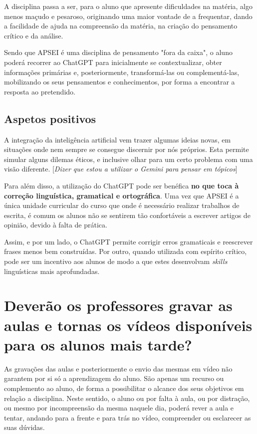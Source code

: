 \documentclass[portuguese, 11pt, a4paper, titlepage, oneside]{article}
\begin{document}
A disciplina passa a ser, para o aluno que apresente dificuldades na matéria, algo menos maçudo e pesaroso, originando uma maior vontade de a frequentar, dando a facilidade de ajuda na compreensão da matéria, na criação do pensamento crítico e da análise.

Sendo que APSEI é uma disciplina de pensamento "fora da caixa", o aluno poderá recorrer ao ChatGPT para inicialmente se contextualizar, obter informações primárias e, posteriormente, transformá-las ou complementá-las, mobilizando os seus pensamentos e conhecimentos, por forma a encontrar a resposta ao pretendido.

\subsection{Aspetos positivos}
A integração da inteligência artificial vem trazer algumas ideias novas, em situações onde nem sempre se consegue discernir por nós próprios. Esta permite simular alguns dilemas éticos, e inclusive olhar para um certo problema com uma visão diferente. [\textit{Dizer que estou a utilizar o Gemini para pensar em tópicos}]

Para além disso, a utilização do ChatGPT pode ser benéfica \textbf{no que toca à correção linguística, gramatical e ortográfica}. Uma vez que APSEI é a única unidade curricular do curso que onde é necessário realizar trabalhos de escrita, é comum os alunos não se sentirem tão confortáveis a escrever artigos de opinião, devido à falta de prática.

Assim, e por um lado, o ChatGPT permite corrigir erros gramaticais e reescrever frases menos bem construídas. Por outro, quando utilizada com espírito crítico, pode ser um incentivo aos alunos de modo a que estes desenvolvam \textit{skills} linguísticas mais aprofundadas.

\section{Deverão os professores gravar as aulas e tornas os vídeos disponíveis para os alunos mais tarde?}
As gravações das aulas e posteriormente o envio das mesmas em vídeo não garantem por si só a aprendizagem do aluno. São apenas um recurso ou complemento ao aluno, de forma a possibilitar o alcance dos seus objetivos em relação a disciplina. Neste sentido, o aluno ou por falta à aula, ou por distração, ou mesmo por incompreensão da mesma naquele dia, poderá rever a aula e tentar, andando para a frente e para trás no vídeo, compreender ou esclarecer as suas dúvidas.
\end{document}
